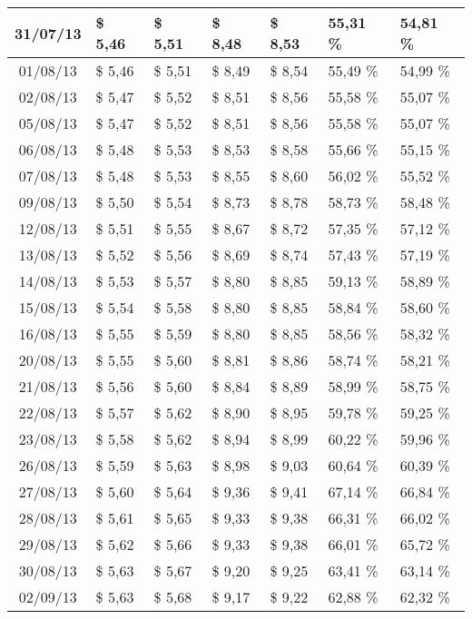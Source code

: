 \begin{center}
\begin{longtable}{|c|p{1.5cm}|p{1.5cm}|p{1.5cm}|p{1.5cm}|p{1.5cm}|p{1.5cm}|}
31/07/13 & \$ 5,46 & \$ 5,51 & \$ 8,48 & \$ 8,53 & 55,31 \% & 54,81 \% \\ \hline
01/08/13 & \$ 5,46 & \$ 5,51 & \$ 8,49 & \$ 8,54 & 55,49 \% & 54,99 \% \\ \hline
02/08/13 & \$ 5,47 & \$ 5,52 & \$ 8,51 & \$ 8,56 & 55,58 \% & 55,07 \% \\ \hline
05/08/13 & \$ 5,47 & \$ 5,52 & \$ 8,51 & \$ 8,56 & 55,58 \% & 55,07 \% \\ \hline
06/08/13 & \$ 5,48 & \$ 5,53 & \$ 8,53 & \$ 8,58 & 55,66 \% & 55,15 \% \\ \hline
07/08/13 & \$ 5,48 & \$ 5,53 & \$ 8,55 & \$ 8,60 & 56,02 \% & 55,52 \% \\ \hline
09/08/13 & \$ 5,50 & \$ 5,54 & \$ 8,73 & \$ 8,78 & 58,73 \% & 58,48 \% \\ \hline
12/08/13 & \$ 5,51 & \$ 5,55 & \$ 8,67 & \$ 8,72 & 57,35 \% & 57,12 \% \\ \hline
13/08/13 & \$ 5,52 & \$ 5,56 & \$ 8,69 & \$ 8,74 & 57,43 \% & 57,19 \% \\ \hline
14/08/13 & \$ 5,53 & \$ 5,57 & \$ 8,80 & \$ 8,85 & 59,13 \% & 58,89 \% \\ \hline
15/08/13 & \$ 5,54 & \$ 5,58 & \$ 8,80 & \$ 8,85 & 58,84 \% & 58,60 \% \\ \hline
16/08/13 & \$ 5,55 & \$ 5,59 & \$ 8,80 & \$ 8,85 & 58,56 \% & 58,32 \% \\ \hline
20/08/13 & \$ 5,55 & \$ 5,60 & \$ 8,81 & \$ 8,86 & 58,74 \% & 58,21 \% \\ \hline
21/08/13 & \$ 5,56 & \$ 5,60 & \$ 8,84 & \$ 8,89 & 58,99 \% & 58,75 \% \\ \hline
22/08/13 & \$ 5,57 & \$ 5,62 & \$ 8,90 & \$ 8,95 & 59,78 \% & 59,25 \% \\ \hline
23/08/13 & \$ 5,58 & \$ 5,62 & \$ 8,94 & \$ 8,99 & 60,22 \% & 59,96 \% \\ \hline
26/08/13 & \$ 5,59 & \$ 5,63 & \$ 8,98 & \$ 9,03 & 60,64 \% & 60,39 \% \\ \hline
27/08/13 & \$ 5,60 & \$ 5,64 & \$ 9,36 & \$ 9,41 & 67,14 \% & 66,84 \% \\ \hline
28/08/13 & \$ 5,61 & \$ 5,65 & \$ 9,33 & \$ 9,38 & 66,31 \% & 66,02 \% \\ \hline
29/08/13 & \$ 5,62 & \$ 5,66 & \$ 9,33 & \$ 9,38 & 66,01 \% & 65,72 \% \\ \hline
30/08/13 & \$ 5,63 & \$ 5,67 & \$ 9,20 & \$ 9,25 & 63,41 \% & 63,14 \% \\ \hline
02/09/13 & \$ 5,63 & \$ 5,68 & \$ 9,17 & \$ 9,22 & 62,88 \% & 62,32 \% \\ \hline

\end{longtable}
\end{center}

